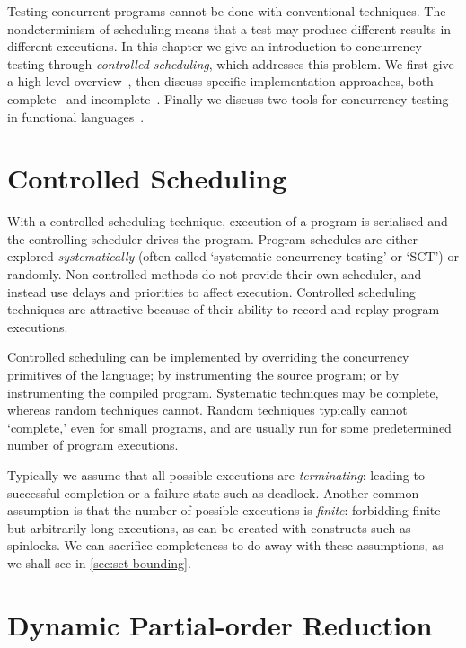 Testing concurrent programs cannot be done with conventional
techniques.  The nondeterminism of scheduling means that a test may
produce different results in different executions.  In this chapter we
give an introduction to concurrency testing through \emph{controlled
  scheduling}, which addresses this problem.  We first give a
high-level overview~, then discuss specific
implementation approaches, both complete~ and
incomplete~.  Finally we discuss two tools for
concurrency testing in functional languages~.

\section{Controlled Scheduling}
\label{sec:sct-fundamentals}

With a controlled scheduling technique, execution of a program is
serialised and the controlling scheduler drives the program.  Program
schedules are either explored
\emph{systematically}\cite{coons2013,flanagan2005,musuvathi2008,musuvathi2007}
(often called `systematic concurrency testing' or `SCT') or
randomly\cite{burckhardt2010,thomson2016}.  Non-controlled methods do
not provide their own scheduler, and instead use delays and priorities
to affect execution\cite{yu2012}.  Controlled scheduling techniques
are attractive because of their ability to record and replay program
executions.

Controlled scheduling can be implemented by overriding the concurrency
primitives of the language\cite{walker2015}; by instrumenting the
source program\cite{claessen2009}; or by instrumenting the compiled
program\cite{musuvathi2006,yu2012}.  Systematic techniques may be
complete, whereas random techniques cannot.  Random techniques
typically cannot `complete,' even for small programs, and are usually
run for some predetermined number of program executions.

Typically we assume that all possible executions are
\emph{terminating}: leading to successful completion or a failure
state such as deadlock.  Another common assumption is that the number
of possible executions is \emph{finite}: forbidding finite but
arbitrarily long executions, as can be created with constructs such as
spinlocks.  We can sacrifice completeness to do away with these
assumptions, as we shall see in \cref{sec:sct-bounding}.

\section{Dynamic Partial-order Reduction}
\label{sec:sct-dpor}

